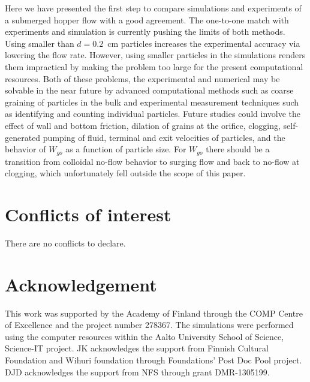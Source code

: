 \documentclass[twoside,twocolumn,9pt]{article}
\begin{document}
{Here we have presented the first step to compare simulations and experiments of a submerged hopper flow with a good }
agreement. The one-to-one match with experiments and simulation is currently pushing the 
limits of both methods.
Using smaller than $d=0.2$~cm particles increases the experimental accuracy via lowering the flow rate. 
{However, using smaller particles in the simulations renders them impractical by making the problem too large for the present computational resources.
Both of these problems, the experimental and numerical may be solvable in the near future by advanced computational methods such as coarse graining of particles in the bulk \cite{Bierwisch2009MPS, QueteschinerCFD17} and experimental measurement techniques such as identifying and counting individual particles. 
Future studies could involve 
the effect of wall and bottom friction, dilation of grains at the orifice, clogging, self-generated pumping of fluid, terminal and exit velocities of particles, 
and the behavior of $W_{go}$ as a function of particle size.
For $W_{go}$ there should be a transition from colloidal no-flow behavior to surging flow and back to no-flow 
at clogging, which unfortunately fell outside the scope of this paper.}

\section{Conflicts of interest}

There are no conflicts to declare.

\section{Acknowledgement}

This work was supported by the Academy of Finland
through the COMP Centre of Excellence and the project
number 278367. The simulations were performed using
the computer resources within the Aalto University
School of Science, Science-IT project. JK acknowledges 
the support from Finnish Cultural Foundation and Wihuri 
foundation through Foundations' Post Doc Pool project. 
DJD acknowledges the support from NFS through grant 
DMR-1305199.


\end{document}

